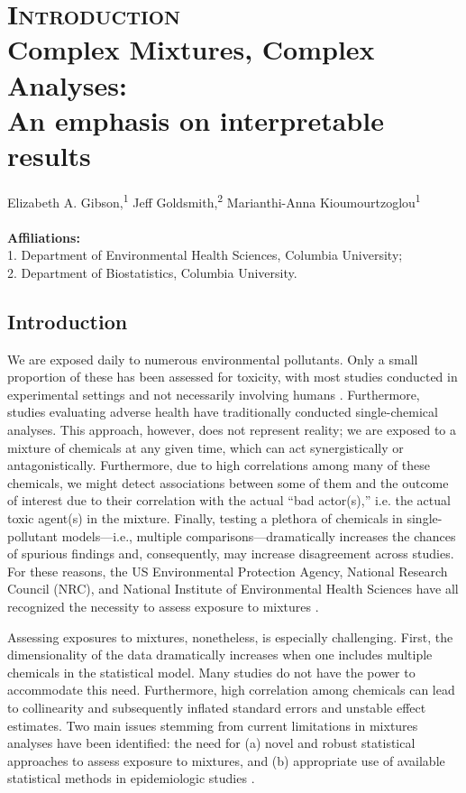 \chapter[Introduction]{\textsc{Introduction} \\
\LARGE Complex Mixtures, Complex Analyses: \\
An emphasis on interpretable results}

\begin{center}
Elizabeth A. Gibson,\textsuperscript{1} 
Jeff Goldsmith,\textsuperscript{2} 
Marianthi-Anna Kioumourtzoglou\textsuperscript{1} \\
\ \\
\textbf{Affiliations:} \\ 1. Department of Environmental Health Sciences, Columbia University; \\ 2. Department of Biostatistics, Columbia University.
\end{center}

\clearpage

\section{Introduction}\label{sec:Intro}

We are exposed daily to numerous environmental pollutants. Only a small proportion of these has been assessed for toxicity, with most studies conducted in experimental settings and not necessarily involving humans \citep{grandjean06}. Furthermore, studies evaluating adverse health have traditionally conducted single-chemical analyses. This approach, however, does not represent reality; we are exposed to a mixture of chemicals at any given time, which can act synergistically or antagonistically. Furthermore, due to high correlations among many of these chemicals, we might detect associations between some of them and the outcome of interest due to their correlation with the actual ``bad actor(s),'' i.e. the actual toxic agent(s) in the mixture. Finally, testing a plethora of chemicals in single-pollutant models---i.e., multiple comparisons---dramatically increases the chances of spurious findings and, consequently, may increase disagreement across studies. For these reasons, the US Environmental Protection Agency, National Research Council (NRC), and National Institute of Environmental Health Sciences have all recognized the necessity to assess exposure to mixtures \citep{epaSP, nrc, niehsSP, niehs_workshop15}.

Assessing exposures to mixtures, nonetheless, is especially challenging. First, the dimensionality of the data dramatically increases when one includes multiple chemicals in the statistical model. Many studies do not have the power to accommodate this need. Furthermore, high correlation among chemicals can lead to collinearity and subsequently inflated standard errors and unstable effect estimates. Two main issues stemming from current limitations in mixtures analyses have been identified: the need for (a) novel and robust statistical approaches to assess exposure to mixtures, and (b) appropriate use of available statistical methods in epidemiologic studies \citep{taylor16, niehs_workshop15}.


